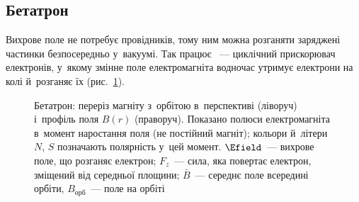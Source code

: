 \subsection*{Бетатрон}\label{sec:Betatron}

Вихрове поле не потребує провідників, тому ним можна розганяти заряджені частинки безпосередньо у~вакуумі. Так працює ~--- циклічний
прискорювач електронів, у~якому змінне поле електромагніта водночас утримує електрони на колі й~розганяє їх (рис.~\ref{pic:Betatron}).

\begin{figure}[h!]\centering
	\caption{Бетатрон: переріз магніту з~орбітою в~перспективі (ліворуч) і~профіль поля $B(r)$ (праворуч). Показано полюси електромагніта в~момент наростання поля (не постійний магніт); кольори й~літери $N$, $S$ позначають полярність у~цей момент. $\Efield$~--- вихрове поле, що розганяє електрон; $F_z$~--- сила, яка повертає електрон, зміщений від середньої площини; $\bar B$~--- середнє поле всередині орбіти, $B_\text{орб}$~--- поле на орбіті\label{pic:Betatron}}
\end{figure}

